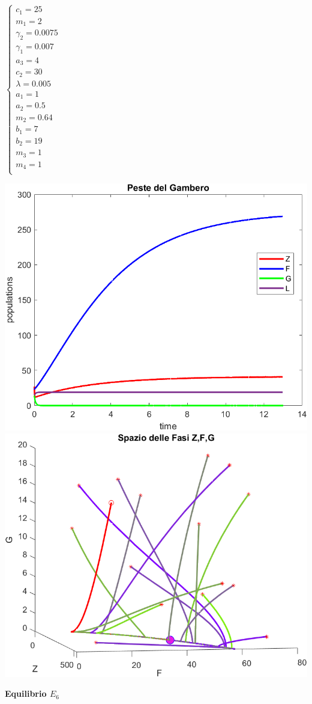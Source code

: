 \documentclass[12pt,a4paper]{article}
\numberwithin{theorem}{section}
\numberwithin{definition}{section}
\numberwithin{example}{section}
\newcommand{\deftitle}[1]{{\color{red}\bf{#1}\color{black}}}
\begin{document}
\begin{minipage}{0.2\textwidth}


$\begin{cases}
	c_1=25\\
	m_1=2\\
	\gamma_2=0.0075\\
	\gamma_1=0.007\\
	a_3=4\\
	c_2=30\\
	\lambda=0.005\\ %
	a_1=1\\
	a_2=0.5\\
	m_2=0.64\\
	b_1=7\\
	b_2=19\\
	m_3=1\\
	m_4=1\\
\end{cases}$ 
\end{minipage}
\begin{minipage}{0.7\textwidth}
    \centering
    \includegraphics[width=6 cm]{grafici/E5_fasi.png} 
    \\
    \includegraphics[width=6 cm]{grafici/E5_ritratto.png}
\end{minipage}

\vspace{1 cm}

\deftitle{Equilibrio $E_6$}
\end{document}

